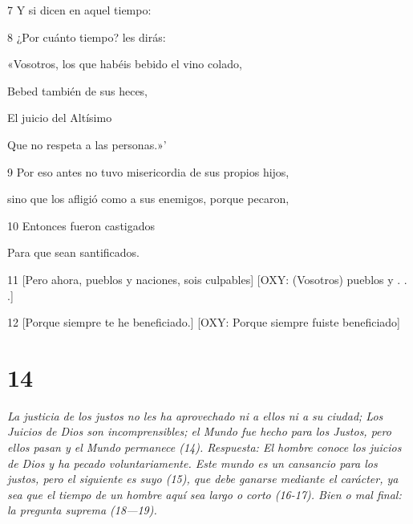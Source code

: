 \par 7 Y si dicen en aquel tiempo:

\par 8 ¿Por cuánto tiempo? les dirás:

\par «Vosotros, los que habéis bebido el vino colado,

\par Bebed también de sus heces,

\par El juicio del Altísimo

\par Que no respeta a las personas.»'

\par 9 Por eso antes no tuvo misericordia de sus propios hijos,

\par sino que los afligió como a sus enemigos, porque pecaron,

\par 10 Entonces fueron castigados

\par Para que sean santificados.

\par 11 [Pero ahora, pueblos y naciones, sois culpables] [OXY: (Vosotros) pueblos y . . .]

\par [Porque siempre habéis hollado la tierra,] [OXY: (Vosotros) habéis hollado la tierra]

\par [Y usó la creación injustamente.] [OXY: Y usó mal las cosas creadas en ella.]

\par 12 [Porque siempre te he beneficiado.] [OXY: Porque siempre fuiste beneficiado]

\par [Y siempre has sido desagradecido por la beneficencia.] [OXY: Pero siempre fuiste desagradecido.]

\chapter{14}

\par \textit{La justicia de los justos no les ha aprovechado ni a ellos ni a su ciudad; Los Juicios de Dios son incomprensibles; el Mundo fue hecho para los Justos, pero ellos pasan y el Mundo permanece (14). Respuesta: El hombre conoce los juicios de Dios y ha pecado voluntariamente. Este mundo es un cansancio para los justos, pero el siguiente es suyo (15), que debe ganarse mediante el carácter, ya sea que el tiempo de un hombre aquí sea largo o corto (16-17). Bien o mal final: la pregunta suprema (18—19).}

